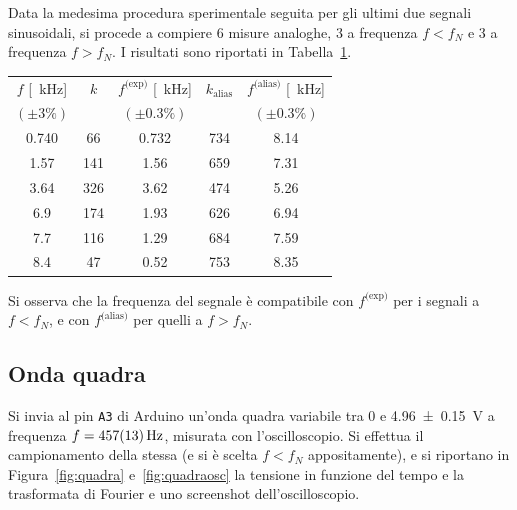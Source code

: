 \documentclass[10pt,oneside,a4paper]{article}
\begin{document}
\begin{multicols}{2}
Data la medesima procedura sperimentale seguita per gli ultimi due segnali sinusoidali, si procede a compiere $6$ misure analoghe, $3$ a frequenza $f<f_N$ e $3$ a frequenza $f>f_N$. I risultati sono riportati in Tabella~\ref{tab:misure_sin}.

\begin{table}
\label{tab:misure_sin}
\centering
\begin{tabular}{c|c|c|c|c}
$f$ [\SI{}{\kilo\Hz}] & $k$ & $f^\text{(exp)}$ [\SI{}{\kilo\Hz}] & $k_\text{alias}$ & $f^\text{(alias)}$ [\SI{}{\kilo\Hz}] \\
$(\pm 3\%)$ & & $(\pm 0.3\%)$ &  & $(\pm 0.3\%)$  \\ 
\hline
0.740 &			66  & 0.732	 & 	734 & 8.14 	\\
1.57 & 			141 & 1.56   & 659	& 7.31 \\
3.64 & 			326 & 3.62	 & 474 	& 5.26 \\  
6.9  &			174 & 1.93	 & 626  & 6.94 \\
7.7  & 			116 & 1.29	 & 684  & 7.59 \\
8.4  &			47  & 0.52	 & 753  & 8.35 \\			 
\hline
\end{tabular}
\end{table}

Si osserva che la frequenza del segnale è compatibile con $f^\text{(exp)}$ per i segnali a $f<f_N$, e con $f^\text{(alias)}$ per quelli a $f>f_N$.

\subsection{Onda quadra}
Si invia al pin \texttt{A3} di Arduino un'onda quadra variabile tra $0$ e \SI{4.96 \pm 0.15}{V} a frequenza $f = \SI{457 \pm 13}{\Hz}$, misurata con l'oscilloscopio. Si effettua il campionamento della stessa (e si è scelta $f<f_N$ appositamente), e si riportano in Figura~\ref{fig:quadra} e~\ref{fig:quadraosc} la tensione in funzione del tempo e la trasformata di Fourier e uno screenshot dell'oscilloscopio. 


\end{multicols}
\end{document}

